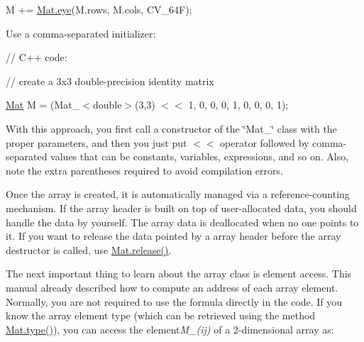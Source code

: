 {\ttfamily M += \mbox{\hyperlink{classorg_1_1opencv_1_1core_1_1_mat_a4de6ffd10feb724153f1ec1231533aa9}{Mat.\+eye}}(M.\+rows, M.\+cols, C\+V\+\_\+64F);}

{\ttfamily }

{\ttfamily }

{\ttfamily }


\begin{DoxyItemize}
\item Use a comma-\/separated initializer\+: 
\end{DoxyItemize}

{\ttfamily }

{\ttfamily }

{\ttfamily }

{\ttfamily // C++ code\+:}

{\ttfamily }

{\ttfamily }

{\ttfamily // create a 3x3 double-\/precision identity matrix}

{\ttfamily }

{\ttfamily }

{\ttfamily \mbox{\hyperlink{classorg_1_1opencv_1_1core_1_1_mat}{Mat}} M = (Mat\+\_\+$<$double$>$(3,3) $<$$<$ 1, 0, 0, 0, 1, 0, 0, 0, 1);}

{\ttfamily }

{\ttfamily }

{\ttfamily }

With this approach, you first call a constructor of the \char`\"{}\+Mat\+\_\+\char`\"{} class with the proper parameters, and then you just put {\ttfamily $<$$<$} operator followed by comma-\/separated values that can be constants, variables, expressions, and so on. Also, note the extra parentheses required to avoid compilation errors.

Once the array is created, it is automatically managed via a reference-\/counting mechanism. If the array header is built on top of user-\/allocated data, you should handle the data by yourself. The array data is deallocated when no one points to it. If you want to release the data pointed by a array header before the array destructor is called, use {\ttfamily \mbox{\hyperlink{classorg_1_1opencv_1_1core_1_1_mat_afb0f872783792b1ba415c2dfcf088a14}{Mat.\+release()}}}.

The next important thing to learn about the array class is element access. This manual already described how to compute an address of each array element. Normally, you are not required to use the formula directly in the code. If you know the array element type (which can be retrieved using the method {\ttfamily \mbox{\hyperlink{classorg_1_1opencv_1_1core_1_1_mat_a555bc7243135e2883afe54e7e5e92c79}{Mat.\+type()}}}), you can access the element{\itshape M\+\_\+(ij)} of a 2-\/dimensional array as\+: {\ttfamily }

